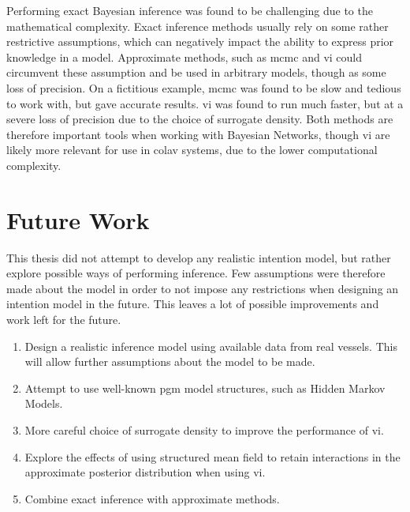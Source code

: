 Performing exact Bayesian inference was found to be challenging due to the mathematical complexity. Exact inference methods usually rely on some rather restrictive assumptions, which can negatively impact the ability to express prior knowledge in a model. Approximate methods, such as \acrshort{mcmc} and \acrshort{vi} could circumvent these assumption and be used in arbitrary models, though as some loss of precision. On a fictitious example, \acrshort{mcmc} was found to be slow and tedious to work with, but gave accurate results. \acrshort{vi} was found to run much faster, but at a severe loss of precision due to the choice of surrogate density. Both methods are therefore important tools when working with Bayesian Networks, though \acrshort{vi} are likely more relevant for use in \acrshort{colav} systems, due to the lower computational complexity. 

\section{Future Work}
This thesis did not attempt to develop any realistic intention model, but rather explore possible ways of performing inference. Few assumptions were therefore made about the model in order to not impose any restrictions when designing an intention model in the future. This leaves a lot of possible improvements and work left for the future.

\begin{enumerate}
    \item Design a realistic inference model using available data from real vessels. This will allow further assumptions about the model to be made. 
    \item Attempt to use well-known \acrshort{pgm} model structures, such as Hidden Markov Models. 
    \item More careful choice of surrogate density to improve the performance of \acrshort{vi}.
    \item Explore the effects of using structured mean field to retain interactions in the approximate posterior distribution when using \acrshort{vi}. 
    \item Combine exact inference with approximate methods.
\end{enumerate}



